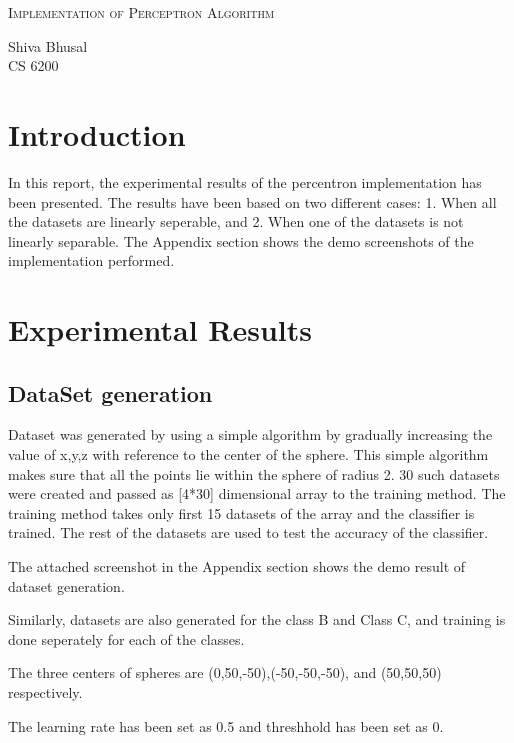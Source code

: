 \documentclass[letterpaper]{article}
\newcommand{\reporttitle}{Implementation of Perceptron Algorithm}
\newcommand{\name}{Shiva Bhusal}
\newcommand{\course}{CS 6200}
\begin{document}
\begin{center}{\huge \scshape \reporttitle}\end{center}
\begin{center}\vspace{0.2em} {\Large \name\\}
  {\course}\end{center}
  
  
  \section{Introduction}
  In this report, the experimental results of the percentron implementation has been presented. The results have been based on two different cases: 1. When all the datasets are linearly seperable, and 2. When one of the datasets is not linearly separable. The Appendix section shows the demo screenshots of the implementation performed. 

  \section {Experimental Results}
  \subsection {DataSet generation}
  Dataset was generated by using a simple algorithm by gradually increasing the value of x,y,z with reference to the center of the sphere. This simple algorithm makes sure that all the points lie within the sphere of radius 2. 30 such datasets were created and passed as [4*30] dimensional array to the training method. The training method takes only first 15 datasets of the array and the classifier is trained. The rest of the datasets are used to test the accuracy of the classifier. 

  The attached screenshot in the Appendix section shows the demo result of dataset generation. 
  
  Similarly, datasets are also generated for the class B and Class C, and training is done seperately for each of the classes. 

  The three centers of spheres are (0,50,-50),(-50,-50,-50), and (50,50,50) respectively. 

  The learning rate has been set as 0.5 and threshhold has been set as 0. 
\end{document}
